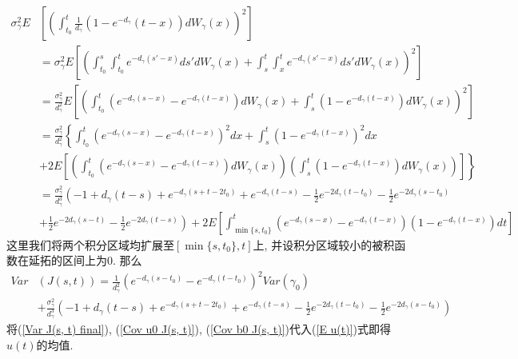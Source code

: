 \documentclass[notitlepage,cs4size,punct,oneside]{ctexrep}
\numberwithin{equation}{section}
\theoremstyle{mystyle}
\begin{document}
\begin{equation} \label{Var J(s, t) 2}
\begin{split}
\sigma_\gamma^2E&\left[\left(\int_{t_0}^t \frac{1}{d_\gamma}\left(1-e^{-d_\gamma}(t-x)\right)dW_\gamma(x)\right)^2\right] \\
&= \sigma_\gamma^2E\left[\left(\int_{t_0}^{s}\int_{t_0}^{t}e^{-d_\gamma(s'-x)}ds'dW_\gamma(x)+\int_s^t\int_x^t e^{-d_\gamma(s'-x)}ds'dW_\gamma(x)\right)^2\right] \\
&= \frac{\sigma_\gamma^2}{d_\gamma^2}E\left[\left(\int_{t_0}^{t} \left(e^{-d_\gamma(s-x)}-e^{-d_\gamma(t-x)}\right)dW_\gamma(x)+\int_{s}^{t} \left(1-e^{-d_\gamma(t-x)}\right)dW_\gamma(x)\right)^2\right] \\
&= \frac{\sigma_\gamma^2}{d_\gamma^2}\left\{\int_{t_0}^t \left(e^{-d_\gamma(s-x)}-e^{-d_\gamma(t-x)}\right)^2dx+\int_{s}^t\left(1-e^{-d_\gamma(t-x)}\right)^2dx\right. \\
&+\left.2E\left[\left(\int_{t_0}^t \left(e^{-d_\gamma(s-x)}-e^{-d_\gamma(t-x)}\right)dW_\gamma(x)\right)\left(\int_{s}^t\left(1-e^{-d_\gamma(t-x)}\right)dW_\gamma(x)\right)\right]\right\} \\
&= \frac{\sigma_\gamma^2}{d_\gamma^3}\left(-1+d_\gamma(t-s)+e^{-d_\gamma(s+t-2t_0)}+e^{-d_\gamma(t-s)}-\frac{1}{2}e^{-2d_\gamma(t-t_0)}-\frac{1}{2}e^{-2d_\gamma(s-t_0)}\right. \\
&+ \left.\frac{1}{2}e^{-2d_\gamma(s-t)}-\frac{1}{2}e^{-2d_\gamma(t-s)}\right) + 2E\left[\int_{\min\{s, t_0\}}^t\left(e^{-d_\gamma(s-x)}-e^{-d_\gamma(t-x)}\right)\left(1-e^{-d_\gamma(t-x)}\right)dt\right]
\end{split}
\end{equation}
这里我们将两个积分区域均扩展至$[\min\{s, t_0\}, t]$上, 并设积分区域较小的被积函数在延拓的区间上为0. 那么
\begin{equation} \label{Var J(s, t) final}
\begin{split}
Var&(J(s, t)) = \frac{1}{d_\gamma^2}\left(e^{-d_\gamma(s-t_0)}-e^{-d_\gamma(t-t_0)}\right)^2Var(\gamma_0) \\
&+ \frac{\sigma_\gamma^2}{d_\gamma^3}\left(-1+d_\gamma(t-s)+e^{-d_\gamma(s+t-2t_0)}+e^{-d_\gamma(t-s)}-\frac{1}{2}e^{-2d_\gamma(t-t_0)}-\frac{1}{2}e^{-2d_\gamma(s-t_0)}\right) 
\end{split}
\end{equation}
将(\ref{Var J(s, t) final}), (\ref{Cov u0 J(s, t)}), (\ref{Cov b0 J(s, t)})代入(\ref{E u(t)})式即得$u(t)$的均值.
\end{document}
